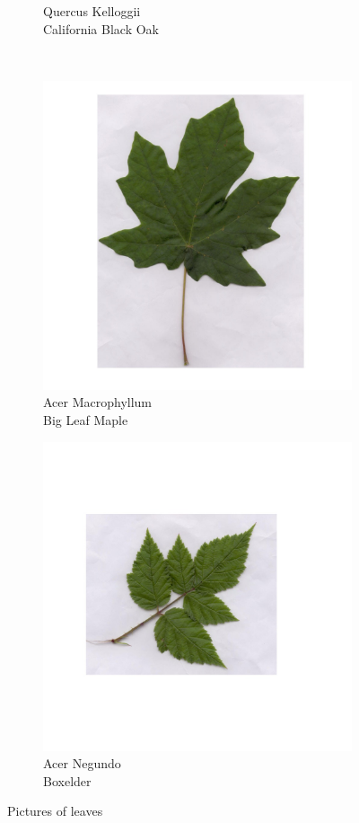 \documentclass[12pt]{article}
\begin{document}
\begin{figure}[b!]
\begin{subfigure}[b]{0.3\textwidth}
        \caption{Quercus Kelloggii\\California Black Oak}
    \end{subfigure}\\
    \begin{subfigure}[b]{0.3\textwidth}
        \includegraphics[width=\textwidth]{macrophyllum_sample.jpg}
        \caption{Acer Macrophyllum\\Big Leaf Maple}
    \end{subfigure}
    \begin{subfigure}[b]{0.3\textwidth}
        \includegraphics[width=\textwidth]{negundo_sample.jpg}
        \caption{Acer Negundo\\Boxelder}
    \end{subfigure}
    \caption{Pictures of leaves}
\end{figure}
\end{document}
